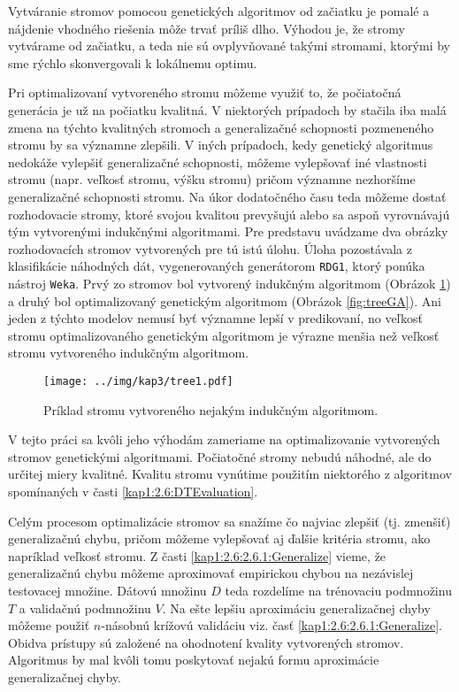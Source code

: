 Vytváranie stromov pomocou genetických algoritmov od začiatku je pomalé a náj\-denie vhodného riešenia môže trvať príliš dlho. Výhodou je, že stromy vytvárame od začiatku, a teda nie sú ovplyvňované takými stromami, ktorými by sme rýchlo skonvergovali k lokálnemu optimu. 

Pri optimalizovaní vytvoreného stromu môžeme využiť to, že počiatočná generácia je už na počiatku kvalitná. V niektorých prípadoch by stačila iba malá zmena na týchto kvalitných stromoch a generalizačné schopnosti pozmeneného stromu by sa významne zlepšili. V iných prípadoch, kedy genetický algoritmus nedokáže vylepšiť generalizačné schopnosti, môžeme vylepšovať iné vlastnosti stromu (napr. veľkosť stromu, výšku stromu) pričom významne nezhoršíme generalizačné schopnosti stromu. Na úkor dodatočného času teda môžeme dostať rozhodovacie stromy, ktoré svojou kvalitou prevyšujú alebo sa aspoň vyrovnávajú tým vytvorenými indukčnými algoritmami. Pre predstavu uvádzame dva obrázky rozhodovacích stromov vytvorených pre tú istú úlohu. Úloha pozostávala z klasifikácie náhodných dát, vygenerovaných generátorom \verb|RDG1|, ktorý ponúka nástroj \verb|Weka|. Prvý zo stromov bol vytvorený indukčným algoritmom (Obrázok \ref{fig:treeIA}) a druhý bol optimalizovaný genetickým algoritmom (Obrázok \ref{fig:treeGA}). Ani jeden z týchto modelov nemusí byť významne lepší v predikovaní, no veľkosť stromu optimalizovaného genetickým algoritmom je výrazne menšia než veľkosť stromu vytvoreného indukčným algoritmom.

\begin{figure}[h]
\centering
\centerline{\mbox{\texttt{[image: ../img/kap3/tree1.pdf]}}}
\caption{Príklad stromu vytvoreného nejakým indukčným algoritmom.}\label{fig:treeIA}
\end{figure}

V tejto práci sa kvôli jeho výhodám zameriame na optimalizovanie vytvorených stromov genetickými algoritmami. Počiatočné stromy nebudú náhodné, ale do určitej miery kvalitné. Kvalitu stromu vynútime použitím niektorého z algoritmov spomínaných v časti \ref{kap1:2.6:DTEvaluation}. 

Celým procesom optimalizácie stromov sa snažíme čo najviac zlepšiť (tj. zmenšiť) generalizačnú chybu, pričom môžeme vylepšovať aj ďalšie kritéria stromu, ako napríklad veľkosť stromu. Z časti \ref{kap1:2.6:2.6.1:Generalize} vieme, že generalizačnú chybu môžeme aproximovať empirickou chybou na nezávislej testovacej množine. Dátovú množinu $D$ teda rozdelíme na trénovaciu podmnožinu $T$ a validačnú podmnožinu $V$. Na ešte lepšiu aproximáciu generalizačnej chyby môžeme použiť $n$-násobnú krížovú validáciu viz. časť \ref{kap1:2.6:2.6.1:Generalize}. Obidva prístupy sú založené na ohodnotení kvality vytvorených stromov. Algoritmus by mal kvôli tomu poskytovať nejakú formu aproximácie generalizačnej chyby.

